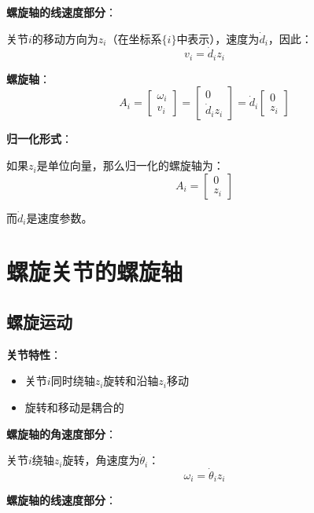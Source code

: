 \documentclass[12pt,a4paper]{article}
\begin{document}
\textbf{螺旋轴的线速度部分}：

关节$i$的移动方向为$z_i$（在坐标系$\{i\}$中表示），速度为$\dot{d}_i$，因此：
\begin{equation}
v_i = \dot{d}_i z_i
\end{equation}

\textbf{螺旋轴}：
\begin{equation}
A_i = \begin{bmatrix} \omega_i \\ v_i \end{bmatrix} = \begin{bmatrix} 0 \\ \dot{d}_i z_i \end{bmatrix} = \dot{d}_i \begin{bmatrix} 0 \\ z_i \end{bmatrix}
\end{equation}

\textbf{归一化形式}：

如果$z_i$是单位向量，那么归一化的螺旋轴为：
\begin{equation}
A_i = \begin{bmatrix} 0 \\ z_i \end{bmatrix}
\end{equation}

而$\dot{d}_i$是速度参数。

\section{螺旋关节的螺旋轴}

\subsection{螺旋运动}

\textbf{关节特性}：
\begin{itemize}
\item 关节$i$同时绕轴$z_i$旋转和沿轴$z_i$移动
\item 旋转和移动是耦合的
\end{itemize}

\textbf{螺旋轴的角速度部分}：

关节$i$绕轴$z_i$旋转，角速度为$\dot{\theta}_i$：
\begin{equation}
\omega_i = \dot{\theta}_i z_i
\end{equation}

\textbf{螺旋轴的线速度部分}：
\end{document}
